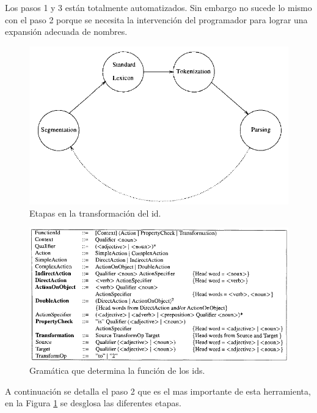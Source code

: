 \documentclass[a4paper,12pt]{report}
\begin{document}
Los pasos 1 y 3 están totalmente automatizados. Sin embargo no sucede lo mismo con el paso 2 porque se necesita la intervención del programador para lograr una expansión adecuada de nombres.

\begin{figure}[h] %
\centering
\includegraphics[scale= 0.60]{./ire_2.png}
\caption{Etapas en la transformación del id.}
\label{ire2}
\end{figure}

\begin{figure}[t] %
\centering
\includegraphics[scale= 0.70]{./ire_3.png}
\caption{Gramática que determina la función de los ids.}
\label{ire3}
\end{figure}

A continuación se detalla el paso 2 que es el mas importante de esta herramienta, en la Figura \ref{ire2} se desglosa las diferentes etapas.
\end{document}
